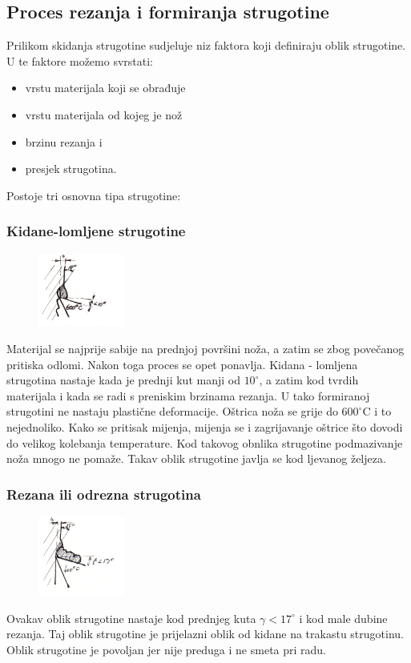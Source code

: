 \documentclass[a4paper,12pt]{article}
\numberwithin{figure}{section}
\begin{document}
\subsection{Proces rezanja i formiranja strugotine}
Prilikom skidanja strugotine sudjeluje niz faktora koji definiraju oblik strugotine. U te faktore možemo svrstati:
\begin{itemize}
\item vrstu materijala koji se obrađuje
\item vrstu materijala od kojeg je nož
\item brzinu rezanja i 
\item presjek strugotina.
\end{itemize}
Postoje tri osnovna tipa strugotine:
\subsubsection*{Kidane-lomljene strugotine}
\begin{figure}
\centering
\includegraphics[width=0.25\textwidth]{image_05-1.png}
\end{figure}
\FloatBarrier
Materijal se najprije sabije na prednjoj površini noža, a zatim se zbog povečanog pritiska odlomi. Nakon toga proces se opet ponavlja.
Kidana - lomljena strugotina nastaje kada je prednji kut manji od $10^{\circ}$, a zatim kod tvrdih materijala i kada se radi s preniskim brzinama rezanja. U tako formiranoj strugotini ne nastaju plastične deformacije. Oštrica noža se grije do $600^{\circ}$C i to nejednoliko. Kako se pritisak mijenja, mijenja se i zagrijavanje oštrice što dovodi do velikog kolebanja temperature. Kod takovog obnlika strugotine podmazivanje noža mnogo ne pomaže. Takav oblik strugotine javlja se kod ljevanog željeza.
\subsubsection*{Rezana ili odrezna strugotina}
\begin{figure}
\centering
\vspace{-0.5cm}
\includegraphics[width=0.25\textwidth]{image_05-2.png}
\vspace{-3cm}
\end{figure}
\FloatBarrier
Ovakav oblik strugotine nastaje kod prednjeg kuta $\gamma < 17^{\circ}$ i kod male dubine rezanja. Taj oblik strugotine je prijelazni oblik od kidane na trakastu strugotinu. Oblik strugotine je povoljan jer nije preduga i ne smeta pri radu. 
\end{document}
